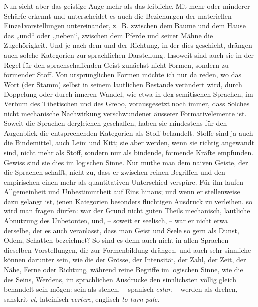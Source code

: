 Nun sieht aber das geistige Auge mehr als das leibliche. Mit mehr oder minderer Schärfe erkennt und unterscheidet es auch die Beziehungen der materiellen Einze1vorstellungen untereinander, z.~B. zwischen dem Baume und dem Hause das „und“ oder „neben“, zwischen dem Pferde und seiner Mähne die Zugehörigkeit. Und je nach dem  und der Richtung, in der dies geschieht, drängen auch solche Kategorien zur sprachlichen Darstellung. Insoweit sind auch sie in der \label{sp.326} Regel für den sprachschaffenden Geist zunächst nicht Formen, sondern zu formender \label{fp.318} Stoff. Von ursprünglichen Formen möchte ich nur da reden, wo das Wort (der Stamm) selbst in seinem lautlichen Bestande verändert wird, durch Doppelung oder durch inneren Wandel, wie etwa in den semitischen Sprachen, im Verbum des Tibetischen und des Grebo, vorausgesetzt noch immer, dass Solches nicht mechanische Nachwirkung verschwundener äusserer Formativelemente ist. Soweit die Sprachen dergleichen geschaffen, haben sie mindestens für den Augenblick die entsprechenden Kategorien als Stoff behandelt. Stoffe sind ja auch die Bindemittel, auch Leim und Kitt; sie aber werden, wenn sie richtig angewandt sind, nicht mehr als Stoff, sondern nur als bindende, formende Kräfte empfunden. Gewiss sind sie dies im logischen Sinne. Nur muthe man dem naiven Geiste, der die Sprachen schafft, nicht zu, dass er zwischen reinen Begriffen und den empirischen einen mehr als quantitativen Unterschied verspüre. Für ihn laufen Allgemeinheit und Unbestimmtheit auf Eins hinaus; und wenn er stellenweise dazu gelangt ist, jenen Kategorien besonders flüchtigen Ausdruck zu verleihen, so wird man fragen dürfen: war der Grund nicht guten Theils mechanisch, lautliche Abnutzung des Unbetonten, und, – soweit er seelisch, – war er nicht etwa derselbe, der es auch veranlasst, dass  man Geist und Seele so gern als Dunst, Odem, Schatten bezeichnet? So sind es denn auch nicht in allen Sprachen dieselben Vorstellungen, die zur Formenbildung drängen, und auch sehr sinnliche können darunter sein, wie die der Grösse, der Intensität, der Zahl, der Zeit, der Nähe, Ferne oder Richtung, während reine Begriffe im logischen Sinne, wie die des Seins, Werdens, im sprachlichen Ausdrucke den sinnlichsten völlig gleich behandelt sein mögen: sein als stehen, – spanisch \textit{estar},  – werden als drehen, – sanskrit \textit{vt}, lateinisch \textit{vertere}, englisch \textit{to turn pale}.

